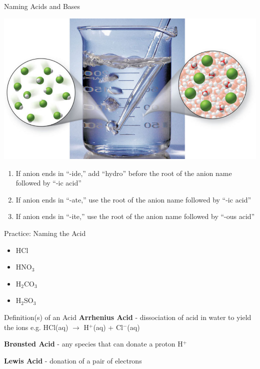 \documentclass[11pt]{beamer}
\begin{document}
\begin{frame}{Naming Acids and Bases}
  \begin{center}
    \includegraphics[width=0.5\linewidth]{acid_base}
  \end{center}

  \begin{enumerate}
  \item If anion ends in ``-ide,'' add ``hydro'' before the
    root of the anion name followed by ``-ic acid''
  \item If anion ends in ``-ate,'' use the root of the anion
    name followed by ``-ic acid''
  \item If anion ends in ``-ite,'' use the root of the anion
    name followed by ``-ous acid''
  \end{enumerate}
\end{frame}

\begin{frame}{Practice: Naming the Acid}
  \begin{itemize}
  \item HCl
  \item HNO$_3$
  \item H$_2$CO$_3$
  \item H$_2$SO$_3$
  \end{itemize}
\end{frame}

\begin{frame}{Definition(s) of an Acid}
  \textbf{Arrhenius Acid} - dissociation of acid in water to yield
  the ions e.g. HCl(aq) $\rightarrow$ H$^+$(aq) + Cl$^-$(aq)
  
  \textbf{Br{\o}nsted Acid} - any species that can donate a proton
  H$^+$

  \textbf{Lewis Acid} - donation of a pair of electrons
\end{frame}
\end{document}
